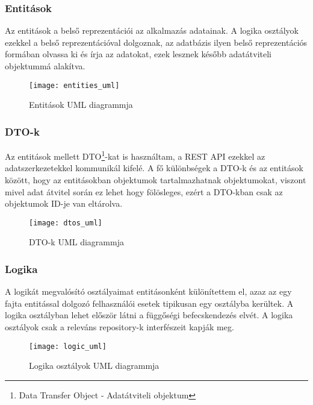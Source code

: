 \clearpage

\subsubsection{Entitások}
Az entitások a belső reprezentációi az alkalmazás adatainak. A logika osztályok ezekkel a belső reprezentációval dolgoznak, az adatbázis ilyen belső reprezentációs formában olvassa ki és írja az adatokat, ezek lesznek később adatátviteli objektummá alakítva.

\begin{figure}[H]
	\centering
	\texttt{[image: entities\_uml]}
	\caption{Entitások UML diagrammja}
	\label{fig:entities}
\end{figure}

\clearpage

\subsubsection{DTO-k}
Az entitások mellett DTO\footnote{Data Transfer Object - Adatátviteli objektum}-kat is használtam, a REST API ezekkel az adatszerkezetekkel kommunikál kifelé. A fő különbségek a DTO-k és az entitások között, hogy az entitásokban objektumok tartalmazhatnak objektumokat, viszont mivel adat átvitel során ez lehet hogy fölösleges, ezért a DTO-kban csak az objektumok ID-je van eltárolva.

\begin{figure}[H]
	\centering
	\texttt{[image: dtos\_uml]}
	\caption{DTO-k UML diagrammja}
	\label{fig:dtos}
\end{figure}

\clearpage

\subsubsection{Logika}
A logikát megvalósító osztályaimat entitásonként különítettem el, azaz az egy fajta entitással dolgozó felhasználói esetek tipikusan egy osztályba kerültek. A logika osztályban lehet először látni a függőségi befecskendezés elvét. A logika osztályok csak a releváns repository-k interfészeit kapják meg.

\begin{figure}[H]
	\centering
	\texttt{[image: logic\_uml]}
	\caption{Logika osztályok UML diagrammja}
	\label{fig:logic}
\end{figure}

\clearpage

